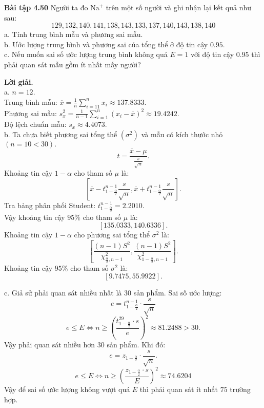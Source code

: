\documentclass[12pt,a4paper]{article}
\begin{document}
\begin{mybox}
\textbf{Bài tập 4.50} Người ta đo $\mathrm{Na}^+$ trên một số người và ghi nhận lại kết quả như sau:
$$129, 132, 140, 141, 138, 143, 133, 137, 140, 143, 138, 140$$
a. Tính trung bình mẫu và phương sai mẫu.\\
b. Ước lượng trung bình và phương sai của tổng thể ở độ tin cậy $0.95.$\\
c. Nếu muốn sai số ước lượng trung bình không quá $E = 1$ với độ tin cậy $0.95$ thì phải quan sát mẫu gồm ít nhất mấy người?
\end{mybox}
\textbf{Lời giải.}\\
a. $n = 12.$\\
Trung bình mẫu:
$\overline x  = \frac{1}{n}\sum\limits_{i =1 1}^n {{x_i}}  \approx 137.8333.$\\
Phương sai mẫu: $s_x^2 = \frac{1}{{n - 1}}\sum\limits_{i = 1}^n {{{\left( {{x_i} - \overline x } \right)}^2}}  \approx 19.4242.$\\
Độ lệch chuẩn mẫu: ${s_x} \approx 4.4073.$\\
b. Ta chưa biết phương sai tổng thể $\left( {\sigma^2} \right)$ và mẫu có kích thước nhỏ $\left( {n = 10 < 30} \right).$
$$t = \frac{\overline{x} - \mu}{\frac{s}{\sqrt{n}}}.$$
Khoảng tin cậy $1 - \alpha$ cho tham số $\mu$ là:
$$\left[ {\overline x  - t_{1 - \frac{\alpha }{2}}^{n - 1}\frac{s}{{\sqrt n }},\overline x  + t_{1 - \frac{\alpha }{2}}^{n - 1}\frac{s}{{\sqrt n }}} \right].$$
Tra bảng phân phối Student: $t_{1 - \frac{\alpha }{2}}^{n - 1} = 2.2010.$\\
Vậy khoảng tin cậy $95\%$ cho tham số $\mu$ là:
$$\left[ {135.0333, 140.6336} \right].$$
Khoảng tin cậy $1 - \alpha$ cho phương sai tổng thể $\sigma^2$ là:
$$\left[ {\frac{{\left( {n - 1} \right){S^2}}}{{\chi _{\frac{\alpha }{2},n - 1}^2}},\frac{{\left( {n - 1} \right){S^2}}}{{\chi _{1 - \frac{\alpha }{2},n - 1}^2}}} \right].$$
Khoảng tin cậy $95\%$ cho tham số $\sigma^2$ là:
$$\left[ {9.7475, 55.9922} \right].$$

c.  Giả sử phải quan sát nhiều nhất là $30$ sản phẩm. Sai số ước lượng:
$$e = t_{1 - \frac{\alpha }{2}}^{n - 1} \cdot \frac{s}{{\sqrt n }}$$
$$e \leqslant E \Leftrightarrow n \geqslant {\left( {\frac{{t_{1 - \frac{\alpha }{2}}^{29} \cdot s}}{e}} \right)^2} \approx 81.2488 > 30.$$
Vậy phải quan sát nhiều hơn $30$ sản phẩm. Khi đó:
$$e = z_{1 - \frac{\alpha}{2}} \cdot \frac{s}{\sqrt{n}}.$$
$$e \leqslant E \Leftrightarrow n \geqslant {\left( {\frac{{{z_{1 - \frac{\alpha }{2}}} \cdot s}}{E}} \right)^2} \approx 74.6204$$
Vậy để sai số ước lượng không vượt quá $E$ thì phải quan sát ít nhất $75$ trường hợp.
\end{document}
